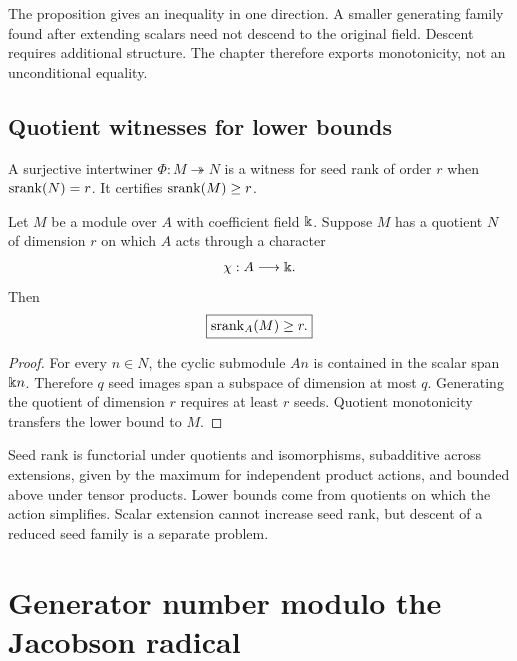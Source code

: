 \begin{hypothesisguide}
The proposition gives an inequality in one direction.  A smaller generating family found after extending scalars need not descend to the original field.  Descent requires additional structure.  The chapter therefore exports monotonicity, not an unconditional equality.
\end{hypothesisguide}


\subsection{Quotient witnesses for lower bounds}
\begin{definition}
\label{def:seed-rank-witness}
A surjective intertwiner $\Phi:M\twoheadrightarrow N$ is a witness for seed rank of order $r$ when $\operatorname{srank}(N)=r$.  It certifies $\operatorname{srank}(M)\geq r$.
\end{definition}

\begin{proposition}
\label{prop:scalar-quotient}
Let $M$ be a module over $A$ with coefficient field $\Bbbk$.  Suppose $M$ has a quotient $N$ of dimension $r$ on which $A$ acts through a character
\[
\chi:A\longrightarrow\Bbbk.
\]
Then
\[
\boxed{\operatorname{srank}_A(M)\geq r.}
\]
\end{proposition}

\begin{proof}
For every $n\in N$, the cyclic submodule $An$ is contained in the scalar span $\Bbbk n$.  Therefore $q$ seed images span a subspace of dimension at most $q$.  Generating the quotient of dimension $r$ requires at least $r$ seeds.  Quotient monotonicity transfers the lower bound to $M$.
\end{proof}

\begin{sectionrecap}
Seed rank is functorial under quotients and isomorphisms, subadditive across extensions, given by the maximum for independent product actions, and bounded above under tensor products.  Lower bounds come from quotients on which the action simplifies.  Scalar extension cannot increase seed rank, but descent of a reduced seed family is a separate problem.
\end{sectionrecap}

\section{Generator number modulo the Jacobson radical}




